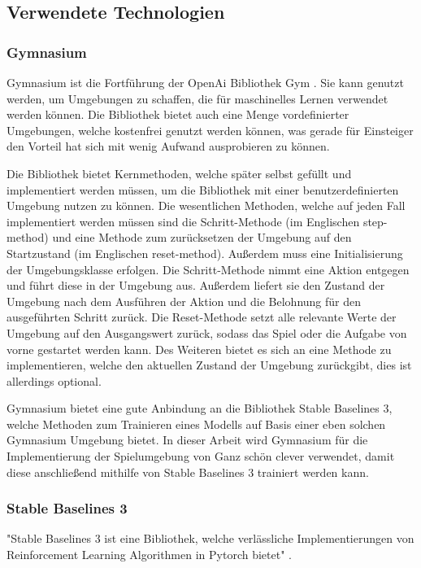 \subsection{Verwendete Technologien}
\subsubsection{Gymnasium}
Gymnasium ist die Fortführung der OpenAi Bibliothek Gym \cite{noauthor_gymnasium_nodate}. Sie kann genutzt werden, um Umgebungen zu schaffen, die für maschinelles Lernen verwendet werden können. Die Bibliothek bietet auch eine Menge vordefinierter Umgebungen, welche kostenfrei genutzt werden können, was gerade für Einsteiger den Vorteil hat sich mit wenig Aufwand ausprobieren zu können.

Die Bibliothek bietet Kernmethoden, welche später selbst gefüllt und implementiert werden müssen, um die Bibliothek mit einer benutzerdefinierten Umgebung nutzen zu können. Die wesentlichen Methoden, welche auf jeden Fall implementiert werden müssen sind die Schritt-Methode (im Englischen step-method) und eine Methode zum zurücksetzen der Umgebung auf den Startzustand (im Englischen reset-method). Außerdem muss eine Initialisierung der Umgebungsklasse erfolgen. Die Schritt-Methode nimmt eine Aktion entgegen und führt diese in der Umgebung aus. Außerdem liefert sie den Zustand der Umgebung nach dem Ausführen der Aktion und die Belohnung für den ausgeführten Schritt zurück. Die Reset-Methode setzt alle relevante Werte der Umgebung auf den Ausgangswert zurück, sodass das Spiel oder die Aufgabe von vorne gestartet werden kann. Des Weiteren bietet es sich an eine Methode zu implementieren, welche den aktuellen Zustand der Umgebung zurückgibt, dies ist allerdings optional.

Gymnasium bietet eine gute Anbindung an die Bibliothek Stable Baselines 3, welche Methoden zum Trainieren eines Modells auf Basis einer eben solchen Gymnasium Umgebung bietet. In dieser Arbeit wird Gymnasium für die Implementierung der Spielumgebung von Ganz schön clever verwendet, damit diese anschließend mithilfe von Stable Baselines 3 trainiert werden kann.
\subsubsection{Stable Baselines 3}
"Stable Baselines 3 ist eine Bibliothek, welche verlässliche Implementierungen von Reinforcement Learning Algorithmen in Pytorch bietet" \cite[Seite 1]{noauthor_stable-baselines3_nodate}. 

